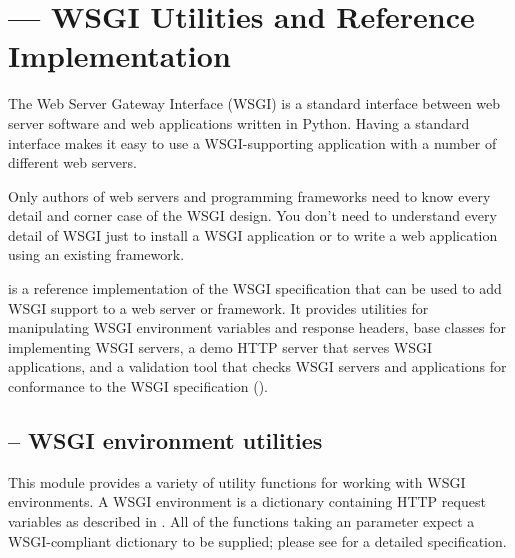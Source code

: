 \section{ --- WSGI Utilities and Reference
Implementation}

The Web Server Gateway Interface (WSGI) is a standard interface
between web server software and web applications written in Python.
Having a standard interface makes it easy to use a WSGI-supporting
application with a number of different web servers.

Only authors of web servers and programming frameworks need to know
every detail and corner case of the WSGI design.  You don't need to
understand every detail of WSGI just to install a WSGI application or
to write a web application using an existing framework.

 is a reference implementation of the WSGI specification
that can be used to add WSGI support to a web server or framework.  It
provides utilities for manipulating WSGI environment variables and
response headers, base classes for implementing WSGI servers, a demo
HTTP server that serves WSGI applications, and a validation tool that
checks WSGI servers and applications for conformance to the
WSGI specification ().















\subsection{ -- WSGI environment utilities}

This module provides a variety of utility functions for working with
WSGI environments.  A WSGI environment is a dictionary containing
HTTP request variables as described in .  All of the functions
taking an  parameter expect a WSGI-compliant dictionary to
be supplied; please see  for a detailed specification.

